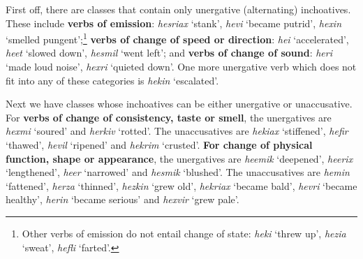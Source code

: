 First off, there are classes that contain only unergative (alternating) inchoatives. These include \textbf{verbs of emission}: \emph{hesriax} `stank', \emph{hevi} `became putrid', \emph{he{\texttslig}xin} `smelled pungent';\footnote{Other verbs of emission do not entail change of state: \emph{heki} `threw up', \emph{hezia} `sweat', \emph{hefli{\texttslig}} `farted'.} %
\textbf{verbs of change of speed or direction}: \emph{hei{\texttslig}} `accelerated', \emph{heet} `slowed down', \emph{hesmil} `went left'; %
and \textbf{verbs of change of sound}: \emph{heri} `made loud noise', \emph{hexri} `quieted down'. %
One more unergative verb which does not fit into any of these categories is \emph{hek{\texttslig}in} `escalated'.

Next we have classes whose inchoatives can be either unergative or unaccusative. For
\textbf{verbs of change of consistency, taste or smell}, the unergatives are \emph{hexmi{\texttslig}} `soured' and \emph{herkiv} `rotted'. The unaccusatives are \emph{hekiax} `stiffened', \emph{hefir} `thawed', \emph{hevil} `ripened' and \emph{hekrim} `crusted'. %
\textbf{For change of physical function, shape or appearance}, the unergatives are \emph{heemik} `deepened', \emph{heerix} `lengthened', \emph{he{\texttslig}er} `narrowed' and \emph{hesmik} `blushed'. The unaccusatives are \emph{hemin} `fattened', \emph{herza} `thinned', \emph{hezkin} `grew old', \emph{hekriax} `became bald', \emph{hevri} `became healthy', \emph{her{\texttslig}in} `became serious' and \emph{hexvir} `grew pale'. %

